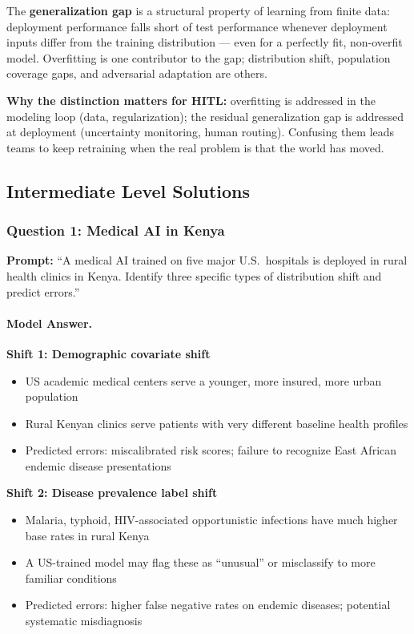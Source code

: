The \textbf{generalization gap} is a structural property of learning from finite data: deployment performance falls short of test performance whenever deployment inputs differ from the training distribution --- even for a perfectly fit, non-overfit model. Overfitting is one contributor to the gap; distribution shift, population coverage gaps, and adversarial adaptation are others.

\textbf{Why the distinction matters for HITL:} overfitting is addressed in the modeling loop (data, regularization); the residual generalization gap is addressed at deployment (uncertainty monitoring, human routing). Confusing them leads teams to keep retraining when the real problem is that the world has moved.

\subsection{Intermediate Level Solutions}

\subsubsection{Question 1: Medical AI in Kenya}

\textbf{Prompt:} ``A medical AI trained on five major U.S.\ hospitals is deployed in rural health clinics in Kenya. Identify three specific types of distribution shift and predict errors.''

\paragraph{Model Answer.}

\textbf{Shift 1: Demographic covariate shift}
\begin{itemize}
    \item US academic medical centers serve a younger, more insured, more urban population
    \item Rural Kenyan clinics serve patients with very different baseline health profiles
    \item Predicted errors: miscalibrated risk scores; failure to recognize East African endemic disease presentations
\end{itemize}

\textbf{Shift 2: Disease prevalence label shift}
\begin{itemize}
    \item Malaria, typhoid, HIV-associated opportunistic infections have much higher base rates in rural Kenya
    \item A US-trained model may flag these as ``unusual'' or misclassify to more familiar conditions
    \item Predicted errors: higher false negative rates on endemic diseases; potential systematic misdiagnosis
\end{itemize}

